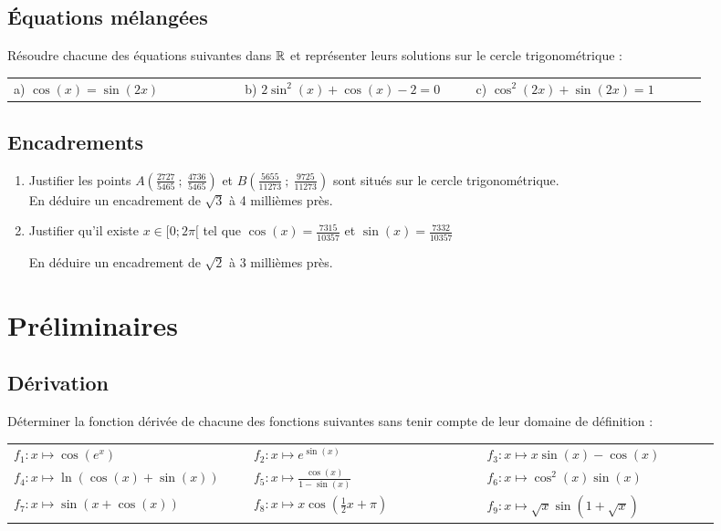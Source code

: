 \documentclass[oneside,12pt]{book}          %
\begin{document}
\subsection{Équations mélangées}
Résoudre chacune des équations suivantes dans ${\mathbb R}$ et représenter leurs solutions sur le cercle trigonométrique :

\begin{tabular}{p{0.3\linewidth}p{0.3\linewidth}p{0.3\linewidth}}
	a) $\cos(x)=\sin(2x)$ & b) $2\sin^2(x)+\cos(x)-2=0$ & c) $\cos^2(2x)+\sin(2x)=1$
\end{tabular}


\subsection{Encadrements}
\begin{enumerate}
	\item Justifier les points $A\left(\frac{2727}{5465}~;~\frac{4736}{5465}\right)$ et $B\left(\frac{5655}{11273}~;~\frac{9725}{11273}\right)$ sont situés sur le cercle trigonométrique. \\
	En déduire un encadrement de $\sqrt{3}$ à 4 millièmes près.
	\item Justifier qu'il existe $x\in[0;2\pi[$ tel que $\cos(x)=\frac{7315}{10357}$ et $\sin(x)=\frac{7332}{10357}$

	En déduire un encadrement de $\sqrt2$ à 3 millièmes près.
\end{enumerate}



\section{Préliminaires}

\subsection{Dérivation}
Déterminer la fonction dérivée de chacune des fonctions suivantes sans tenir compte de leur domaine de définition :

\renewcommand{\arraystretch}{1.5}
\begin{tabular}{p{0.3\linewidth}p{0.3\linewidth}p{0.3\linewidth}}
	$f_1:x\mapsto \cos\left(e^x\right)$ & $f_2:x\mapsto e^{\sin(x)}$ & $f_3:x\mapsto x\sin(x)-\cos(x)$ \\
	$f_4:x\mapsto \ln(\cos(x)+\sin(x))$ & $f_5:x\mapsto \frac{\cos(x)}{1-\sin(x)}$ & $f_6:x\mapsto \cos^2(x)\sin(x)$ \\
	$f_7:x\mapsto \sin\left(x+\cos(x)\right)$ & $f_8:x\mapsto x\cos\left(\frac{1}{2}x+\pi\right)$ & $f_9:x\mapsto \sqrt{x}\sin\left(1+\sqrt{x}\right)$
\end{tabular}
\end{document}
